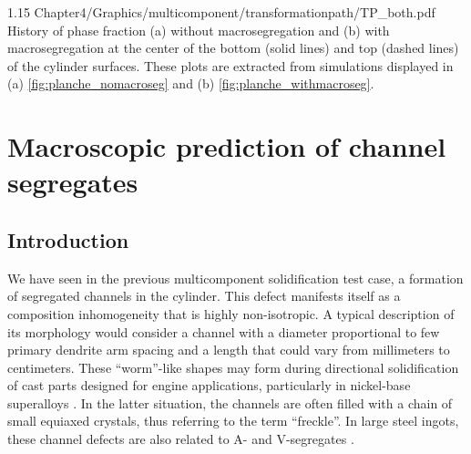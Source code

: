\begin{landscape}
\begin{figureth}
{1.15}
{Chapter4/Graphics/multicomponent/transformationpath/TP_both.pdf}
{History of phase fraction (a) without macrosegregation and (b) with 
macrosegregation at the center of the bottom (solid lines) and top (dashed lines) 
of the cylinder surfaces.
These plots are extracted from simulations displayed in (a) \cref{fig:planche_nomacroseg}
and (b) \cref{fig:planche_withmacroseg}.}
\label{fig:tp_macroseg_influence}
\end{figureth}
\end{landscape}


\section{Macroscopic prediction of channel segregates}

\subsection{Introduction}  \label{sec:intro_freckle}

We have seen in the previous multicomponent solidification test case, a formation of segregated channels in the cylinder. 
This defect manifests itself as a composition inhomogeneity that is highly non-isotropic. A typical description of its 
morphology would consider a channel with a diameter proportional to few primary dendrite arm spacing and a length that 
could vary from millimeters to centimeters. These “worm”-like shapes may form during directional solidification of cast 
parts designed for engine applications, particularly in nickel-base superalloys \citep{giamei_nature_1970,beckermann_development_2000,
genereux_characterization_2000,schneider_modeling_1997}. In the latter situation, the channels are often filled with a chain of small equiaxed 
crystals, thus referring to the term “freckle”. In large steel ingots, these channel defects are also related to A- and V-segregates   
\citep{pickering_macrosegregation_2013}. 

